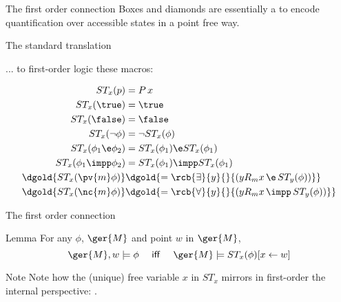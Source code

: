 \documentclass{beamer}
\begin{document}
\begin{slide}{The first order connection}\label{s:20}
\small
Boxes and diamonds are essentially a  to encode quantification over accessible states in a point free way. \\
\vspace{0.2cm}

\begin{block}{The standard translation}

... to first-order logic  these macros:

\begin{align*}
ST_x (p) & =  P\, x\\
ST_x (\true) & =  \true \\
ST_x (\false) & =  \false\\
ST_x (\neg \phi) & =  \neg ST_x (\phi)\\
ST_x (\phi_1 \e \phi_2) & =  ST_x (\phi_1) \e  ST_x (\phi_1)\\
ST_x (\phi_1 \impp \phi_2) & =  ST_x (\phi_1) \impp  ST_x (\phi_1)\\
\dgold{ST_x (\pv{m} \phi) }& \dgold{=  \rcb{\exists}{y}{}{(y R_m x\, \e\, ST_y(\phi))} }  \\
\dgold{ST_x (\nc{m} \phi) }& \dgold{=  \rcb{\forall}{y}{}{(y R_m x\, \impp\, ST_y(\phi))} }  \\
\end{align*}
\end{block}
\end{slide}


\begin{slide}{The first order connection}\label{s:21}
\small

\begin{block}{Lemma}
For any $\phi$, $\ger{M}$ and point $w$ in $\ger{M}$, 
\begin{equation*}
\ger{M}, w  \models \phi \text{~~~ \textsf{iff} ~~~}  \ger{M}  \models ST_x(\phi) [x \leftarrow w]
\end{equation*}
\end{block}
\begin{block}{Note}
Note how the (unique) free variable $x$ in $ST_x$ mirrors in first-order the internal perspective: 
.
\end{block}
\end{slide}
\end{document}
